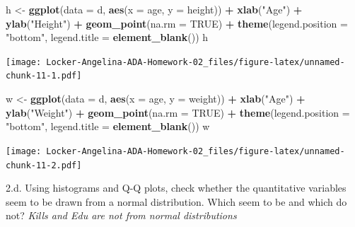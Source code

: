 \documentclass[]{article}
\newenvironment{Shaded}{\begin{snugshade}}{\end{snugshade}}
\newcommand{\KeywordTok}[1]{\textcolor[rgb]{0.13,0.29,0.53}{\textbf{#1}}}
\newcommand{\DataTypeTok}[1]{\textcolor[rgb]{0.13,0.29,0.53}{#1}}
\newcommand{\StringTok}[1]{\textcolor[rgb]{0.31,0.60,0.02}{#1}}
\newcommand{\OtherTok}[1]{\textcolor[rgb]{0.56,0.35,0.01}{#1}}
\newcommand{\OperatorTok}[1]{\textcolor[rgb]{0.81,0.36,0.00}{\textbf{#1}}}
\newcommand{\NormalTok}[1]{#1}
\begin{document}
\begin{Shaded}
\begin{Highlighting}[]
\NormalTok{h <-}\StringTok{ }\KeywordTok{ggplot}\NormalTok{(}\DataTypeTok{data =}\NormalTok{ d, }\KeywordTok{aes}\NormalTok{(}\DataTypeTok{x =}\NormalTok{ age, }\DataTypeTok{y =}\NormalTok{ height)) }\OperatorTok{+}\StringTok{ }\KeywordTok{xlab}\NormalTok{(}\StringTok{"Age"}\NormalTok{) }\OperatorTok{+}\StringTok{ }\KeywordTok{ylab}\NormalTok{(}\StringTok{"Height"}\NormalTok{) }\OperatorTok{+}\StringTok{ }\KeywordTok{geom_point}\NormalTok{(}\DataTypeTok{na.rm =} \OtherTok{TRUE}\NormalTok{) }\OperatorTok{+}\StringTok{ }\KeywordTok{theme}\NormalTok{(}\DataTypeTok{legend.position =} \StringTok{"bottom"}\NormalTok{, }\DataTypeTok{legend.title =} \KeywordTok{element_blank}\NormalTok{())}
\NormalTok{h}
\end{Highlighting}
\end{Shaded}

\texttt{[image: Locker-Angelina-ADA-Homework-02\_files/figure-latex/unnamed-chunk-11-1.pdf]}

\begin{Shaded}
\begin{Highlighting}[]
\NormalTok{w <-}\StringTok{ }\KeywordTok{ggplot}\NormalTok{(}\DataTypeTok{data =}\NormalTok{ d, }\KeywordTok{aes}\NormalTok{(}\DataTypeTok{x =}\NormalTok{ age, }\DataTypeTok{y =}\NormalTok{ weight)) }\OperatorTok{+}\StringTok{ }\KeywordTok{xlab}\NormalTok{(}\StringTok{"Age"}\NormalTok{) }\OperatorTok{+}\StringTok{ }\KeywordTok{ylab}\NormalTok{(}\StringTok{"Weight"}\NormalTok{) }\OperatorTok{+}\StringTok{ }\KeywordTok{geom_point}\NormalTok{(}\DataTypeTok{na.rm =} \OtherTok{TRUE}\NormalTok{) }\OperatorTok{+}\StringTok{ }\KeywordTok{theme}\NormalTok{(}\DataTypeTok{legend.position =} \StringTok{"bottom"}\NormalTok{, }\DataTypeTok{legend.title =} \KeywordTok{element_blank}\NormalTok{())}
\NormalTok{w}
\end{Highlighting}
\end{Shaded}

\texttt{[image: Locker-Angelina-ADA-Homework-02\_files/figure-latex/unnamed-chunk-11-2.pdf]}

2.d. Using histograms and Q-Q plots, check whether the quantitative
variables seem to be drawn from a normal distribution. Which seem to be
and which do not? \emph{Kills and Edu are not from normal distributions}

\begin{Shaded}
\end{Shaded}
\end{document}

